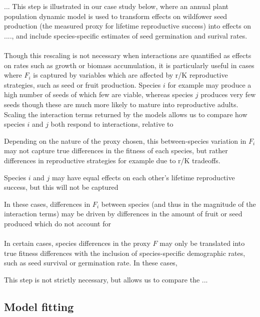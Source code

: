 \documentclass[a4,12pt]{article}
\begin{document}
        ... This step is illustrated in our case study below, where an annual plant population dynamic model is used to transform effects on wildfower seed production (the measured proxy for lifetime reproductive success) into effects on ...., and include species-specific estimates of seed germination and surival rates. 

    

        \paragraph{}
        Though this rescaling is not necessary when interactions are quantified as effects on rates such as growth or biomass accumulation, it is particularly useful in cases where $F_i$ is captured by variables which are affected by r/K reproductive strategies, such as seed or fruit production. Species $i$ for example may produce a high number of seeds of which few are viable, whereas species $j$ produces very few seeds though these are much more likely to mature into reproductive adults. Scaling the interaction terms returned by the models allows us to compare how species $i$ and $j$ both respond to interactions, relative to 

        Depending on the nature of the proxy chosen, this between-species variation in $F_i$ may not capture true differences in the fitness of each species, but rather differences in reproductive strategies for example due to r/K tradeoffs. 

        Species $i$ and $j$ may have equal effects on each other's lifetime reproductive success, but this will not be captured 


        In these cases, differences in $F_i$ between species (and thus in the magnitude of the interaction terms) may be driven by differences in the amount of fruit or seed produced which do not account for 

        \paragraph{} 
        In certain cases, species differences in the proxy $F$ may only be translated into true fitness differences with the inclusion of species-specific demographic rates, such as seed survival or germination rate. In these cases, 


        This step is not strictly necessary, but allows us to compare the ...



    \subsection{Model fitting}
\end{document}
